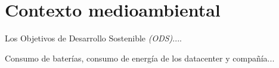     

\section{Contexto medioambiental}

Los Objetivos de Desarrollo Sostenible \textit{(ODS)}....

Consumo de baterías, consumo de energía de los datacenter y compañía...